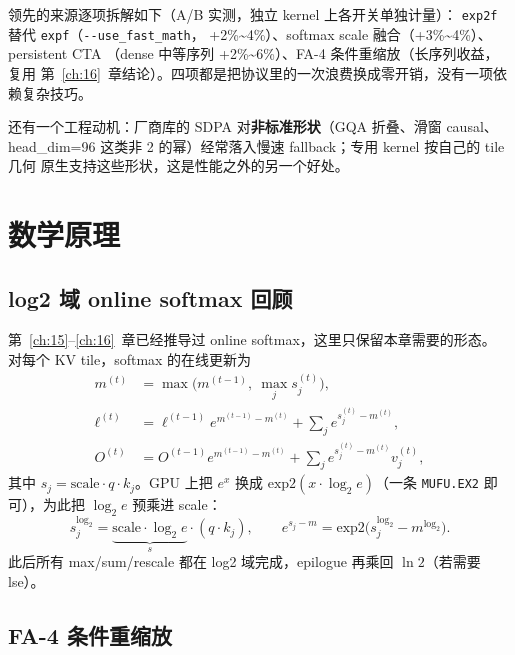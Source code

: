 领先的来源逐项拆解如下（A/B 实测，独立 kernel 上各开关单独计量）：
\texttt{exp2f} 替代 \texttt{expf}（\texttt{-{}-use\_\allowbreak{}fast\_\allowbreak{}math}，
+2\%\textasciitilde4\%）、softmax scale 融合（+3\%\textasciitilde4\%）、persistent CTA
（dense 中等序列 +2\%\textasciitilde6\%）、FA-4 条件重缩放（长序列收益，复用
第~\ref{ch:16}~章结论）。四项都是把协议里的一次浪费换成零开销，没有一项依赖复杂技巧。

还有一个工程动机：厂商库的 SDPA 对\textbf{非标准形状}（GQA 折叠、滑窗 causal、
head\_dim=96 这类非 2 的幂）经常落入慢速 fallback；专用 kernel 按自己的 tile 几何
原生支持这些形状，这是性能之外的另一个好处。

\section{数学原理}\label{sec:26b-math}

\subsection{log2 域 online softmax 回顾}

第~\ref{ch:15}--\ref{ch:16}~章已经推导过 online softmax，这里只保留本章需要的形态。
对每个 KV tile，softmax 的在线更新为
\begin{align}
  m^{(t)} &= \max\!\big(m^{(t-1)},\ \max_j s_j^{(t)}\big), \label{eq:26b-max}\\
  \ell^{(t)} &= \ell^{(t-1)} e^{m^{(t-1)}-m^{(t)}} + \sum_j e^{s_j^{(t)}-m^{(t)}}, \label{eq:26b-sum}\\
  O^{(t)} &= O^{(t-1)} e^{m^{(t-1)}-m^{(t)}} + \sum_j e^{s_j^{(t)}-m^{(t)}} v_j^{(t)}, \label{eq:26b-o}
\end{align}
其中 $s_j = \text{scale}\cdot q\cdot k_j$。GPU 上把 $e^x$ 换成
$\mathrm{exp2}(x\cdot\log_2 e)$（一条 \texttt{MUFU.EX2} 即可），为此把
$\log_2 e$ 预乘进 scale：
\begin{equation}\label{eq:26b-log2domain}
  s_j^{\log_2} = \underbrace{\text{scale}\cdot\log_2 e}_{s}\cdot (q\cdot k_j),
  \qquad e^{s_j - m} = \mathrm{exp2}\!\big(s_j^{\log_2} - m^{\log_2}\big).
\end{equation}
此后所有 max/sum/rescale 都在 log2 域完成，epilogue 再乘回 $\ln 2$（若需要 lse）。

\subsection{FA-4 条件重缩放}

